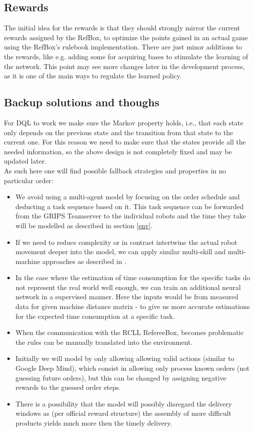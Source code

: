 \documentclass[runningheads,envcountsect]{llncs}
\begin{document}
\subsection{Rewards}
The initial idea for the rewards is that they should strongly mirror the current rewards assigned by the RefBox, to optimize the points gained in an actual game using the RefBox's rulebook implementation. There are just minor additions to the rewards, like e.g. adding some for acquiring bases to stimulate the learning of the network. This point may see more changes later in the development process, as it is one of the main ways to regulate the learned policy.


\subsection{Backup solutions and thoughs} \label{risks}
For DQL to work we make sure the Markov property holds, i.e., that each state only depends on the previous state and the transition from that state to the current one. For this reason we need to make sure that the states provide all the needed information, so the above design is not completely fixed and may be updated later.\\
As such here one will find possible fallback strategies and properties in no particular order:

\begin{itemize}
  \item We avoid using a multi-agent model by focusing on the order schedule and deducting a task sequence based on it. This task sequence can be forwarded from the GRIPS Teamserver to the individual robots and the time they take will be modelled as described in section \ref{env}.
  \item If we need to reduce complexity or in contrast intertwine the actual robot movement deeper into the model, we can apply similar multi-skill and multi-machine approaches as described in \cite{qu2016optimized}.
  \item In the case where the estimation of time consumption for the specific tasks do not represent the real world well enough, we can train an additional neural network in a supervised manner. Here the inputs would be from measured data for given machine distance matrix - to give us more accurate estimations for the expected time consumption at a specific task.
  \item When the communication with the RCLL RefereeBox, becomes problematic the rules can be manually translated into the environment.
  \item Initially we will model by only allowing allowing valid actions (similar to Google Deep Mind), which consist in allowing only process known orders (not guessing future orders), but this can be changed by assigning negative rewards to the guessed order steps.
  \item There is a possibility that the model will possibly disregard the delivery windows as (per official reward structure) the assembly of more difficult products yields much more then the timely delivery.
\end{itemize}
\end{document}
